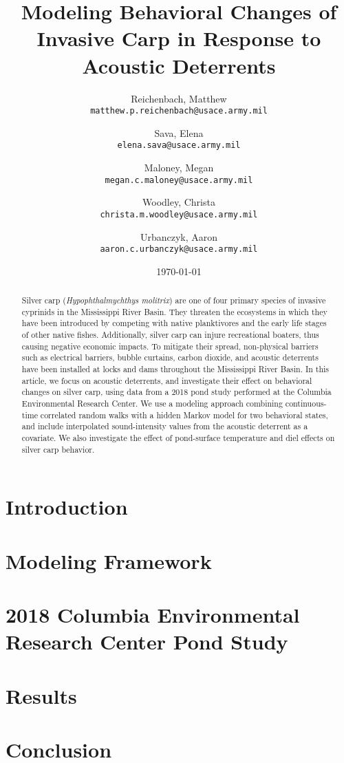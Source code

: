 \documentclass[12pt]{article}
\begin{document}
\begin{abstract}
	Silver carp (\emph{Hypophthalmychthys molitrix}) are one of four primary species of invasive cyprinids in the Mississippi River Basin. They threaten the ecosystems in which they have been introduced by competing with native planktivores and the early life stages of other native fishes. Additionally, silver carp can injure recreational boaters, thus causing negative economic impacts. To mitigate their spread, non-physical barriers such as electrical barriers, bubble curtains, carbon dioxide, and acoustic deterrents have been installed at locks and dams throughout the Mississippi River Basin. In this article, we focus on acoustic deterrents, and investigate their effect on behavioral changes on silver carp, using data from a 2018 pond study performed at the Columbia Environmental Research Center. We use a modeling approach combining continuous-time correlated random walks with a hidden Markov model for two behavioral states, and include interpolated sound-intensity values from the acoustic deterrent as a covariate. We also investigate the effect of pond-surface temperature and diel effects on silver carp behavior.
\end{abstract}

\title{Modeling Behavioral Changes of Invasive Carp in Response to Acoustic Deterrents}
\author{
	Reichenbach, Matthew \\
	\texttt{matthew.p.reichenbach@usace.army.mil}
	\and
	Sava, Elena \\
	\texttt{elena.sava@usace.army.mil}
	\and
	Maloney, Megan \\
	\texttt{megan.c.maloney@usace.army.mil}
	\and
	Woodley, Christa \\
	\texttt{christa.m.woodley@usace.army.mil}
	\and
	Urbanczyk, Aaron \\
	\texttt{aaron.c.urbanczyk@usace.army.mil}
}
\date{\today}

\maketitle

\section{Introduction}

\section{Modeling Framework}

\section{2018 Columbia Environmental Research Center Pond Study}

\section{Results}

\section{Conclusion}



\end{document}
